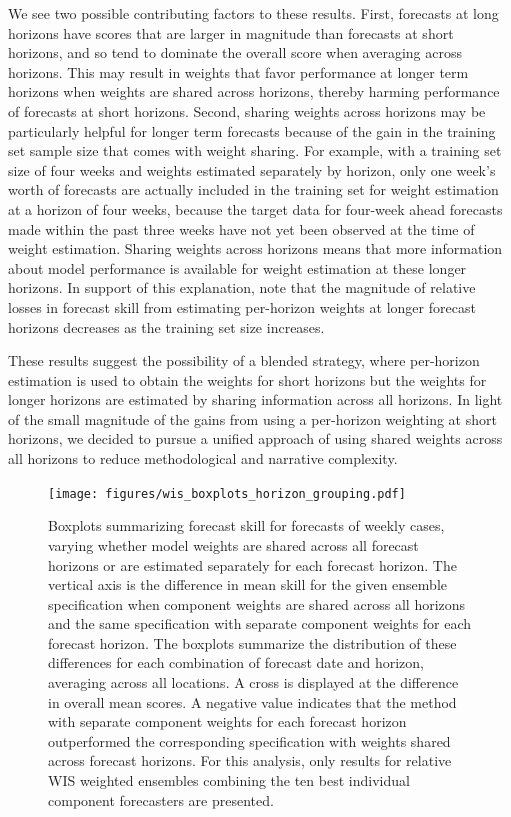 \documentclass{article}
\begin{document}
We see two possible contributing factors to these results. First, forecasts at long horizons have scores that are larger in magnitude than forecasts at short horizons, and so tend to dominate the overall score when averaging across horizons. This may result in weights that favor performance at longer term horizons when weights are shared across horizons, thereby harming performance of forecasts at short horizons. Second, sharing weights across horizons may be particularly helpful for longer term forecasts because of the gain in the training set sample size that comes with weight sharing. For example, with a training set size of four weeks and weights estimated separately by horizon, only one week's worth of forecasts are actually included in the training set for weight estimation at a horizon of four weeks, because the target data for four-week ahead forecasts made within the past three weeks have not yet been observed at the time of weight estimation. Sharing weights across horizons means that more information about model performance is available for weight estimation at these longer horizons. In support of this explanation, note that the magnitude of relative losses in forecast skill from estimating per-horizon weights at longer forecast horizons decreases as the training set size increases.

These results suggest the possibility of a blended strategy, where per-horizon estimation is used to obtain the weights for short horizons but the weights for longer horizons are estimated by sharing information across all horizons. In light of the small magnitude of the gains from using a per-horizon weighting at short horizons, we decided to pursue a unified approach of using shared weights across all horizons to reduce methodological and narrative complexity.

\begin{figure}
  \texttt{[image: figures/wis\_boxplots\_horizon\_grouping.pdf]}
  \caption{Boxplots summarizing forecast skill for forecasts of weekly cases, varying whether model weights are shared across all forecast horizons or are estimated separately for each forecast horizon.
  The vertical axis is the difference in mean skill for the given ensemble specification when component weights are shared across all horizons and the same specification with separate component weights for each forecast horizon.
  The boxplots summarize the distribution of these differences for each combination of forecast date and horizon, averaging across all locations.
  A cross is displayed at the difference in overall mean scores.
  A negative value indicates that the method with separate component weights for each forecast horizon outperformed the corresponding specification with weights shared across forecast horizons.
  For this analysis, only results for relative WIS weighted ensembles combining the ten best individual component forecasters are presented.}
  \label{fig:wis_grouping_by_horizon}
\end{figure}
\end{document}

